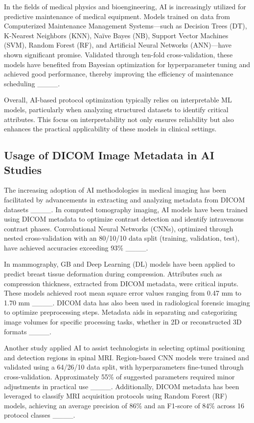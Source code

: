 In the fields of medical physics and bioengineering, AI is increasingly utilized for predictive maintenance of medical equipment. Models trained on data from Computerized Maintenance Management Systems—such as Decision Trees (DT), K-Nearest Neighbors (KNN), Naïve Bayes (NB), Support Vector Machines (SVM), Random Forest (RF), and Artificial Neural Networks (ANN)—have shown significant promise. Validated through ten-fold cross-validation, these models have benefited from Bayesian optimization for hyperparameter tuning and achieved good performance, thereby improving the efficiency of maintenance scheduling ____.

Overall, AI-based protocol optimization typically relies on interpretable ML models, particularly when analyzing structured datasets to identify critical attributes. This focus on interpretability not only ensures reliability but also enhances the practical applicability of these models in clinical settings.


\subsection{Usage of DICOM Image Metadata in AI Studies}
The increasing adoption of AI methodologies in medical imaging has been facilitated by advancements in extracting and analyzing metadata from DICOM datasets ____. In computed tomography imaging, AI models have been trained using DICOM metadata to optimize contrast detection and identify intravenous contrast phases. Convolutional Neural Networks (CNNs), optimized through nested cross-validation with an 80/10/10 data split (training, validation, test), have achieved accuracies exceeding 93\% ____. 

In mammography, GB and Deep Learning (DL) models have been applied to predict breast tissue deformation during compression. Attributes such as compression thickness, extracted from DICOM metadata, were critical inputs. These models achieved root mean square error values ranging from 0.47 mm to 1.70 mm ____. DICOM data has also been used in radiological forensic imaging to optimize preprocessing steps. Metadata aids in separating and categorizing image volumes for specific processing tasks, whether in 2D or reconstructed 3D formats ____. 

Another study applied AI to assist technologists in selecting optimal positioning and detection regions in spinal MRI. Region-based CNN models were trained and validated using a 64/26/10 data split, with hyperparameters fine-tuned through cross-validation. Approximately 55\% of suggested parameters required minor adjustments in practical use ____. Additionally, DICOM metadata has been leveraged to classify MRI acquisition protocols using Random Forest (RF) models, achieving an average precision of 86\% and an F1-score of 84\% across 16 protocol classes ____.

